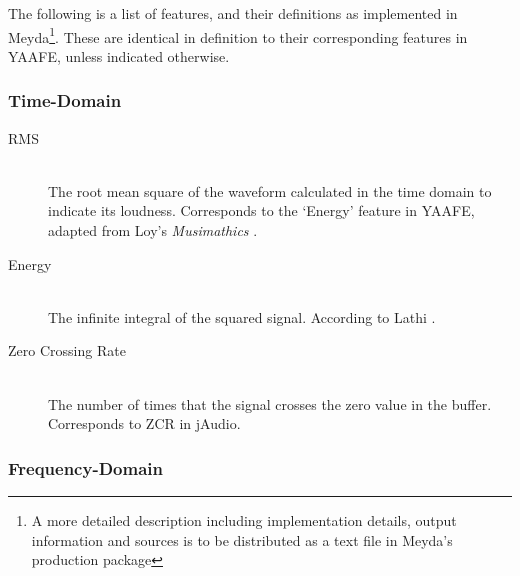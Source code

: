 \documentclass{sig-alternate}
\begin{document}
The following is a list of features, and their definitions as implemented in Meyda\footnote{A more detailed description including implementation details, output information and sources is to be distributed as a text file in Meyda's production package}. These are identical in definition to their corresponding features in YAAFE, unless indicated otherwise.

\subsubsection{Time-Domain}

\begin{description}
       \item[RMS]\hfill \\
       The root mean square of the waveform calculated in the time domain to indicate its loudness. Corresponds to the `Energy' feature in YAAFE, adapted from Loy's \emph{Musimathics} \cite{loy2006}.
       \item[Energy]\hfill \\
       The infinite integral of the squared signal. According to Lathi \cite{lathi1998}.
       \item[Zero Crossing Rate]\hfill \\
       The number of times that the signal crosses the zero value in the buffer. Corresponds to ZCR in jAudio.
\end{description}

\subsubsection{Frequency-Domain}
\end{document}
